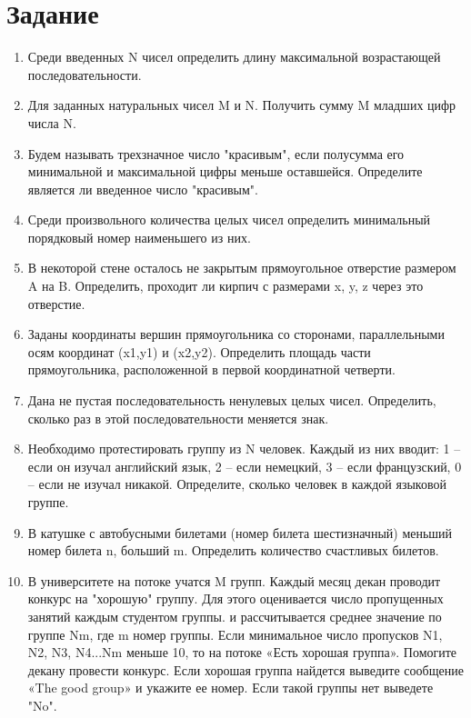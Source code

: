 \documentclass[a4paper,14pt]{extarticle}
\begin{document}
  \section*{Задание}
  \begin{enumerate}
    \item Среди введенных N чисел определить длину максимальной возрастающей последовательности.
    
    \item Для заданных натуральных чисел M и N. Получить сумму M младших цифр числа N.
    
    \item Будем называть трехзначное число "красивым", если полусумма его минимальной и максимальной цифры меньше оставшейся. Определите является ли введенное число "красивым".
    
    \item Среди произвольного количества целых чисел определить минимальный порядковый номер наименьшего из них.
    
    \item В некоторой стене осталось не закрытым прямоугольное отверстие размером A на B. Определить, проходит ли кирпич с размерами x, y, z через это отверстие.
    
    \item Заданы координаты вершин прямоугольника со сторонами, параллельными осям координат (x1,y1) и (x2,y2). Определить площадь части прямоугольника, расположенной в первой координатной четверти.
    
    \item Дана не пустая последовательность ненулевых целых чисел. Определить, сколько раз в этой последовательности меняется знак.
    
    \item Необходимо протестировать группу из N человек. Каждый из них вводит: 1 – если он изучал английский язык, 2 – если немецкий, 3 – если французский, 0 – если не изучал никакой. Определите, сколько человек в каждой языковой группе.
    
    \item В катушке с автобусными билетами (номер билета шестизначный) меньший номер билета n, больший m. Определить количество счастливых билетов.
    
    \item В университете на потоке учатся M групп. Каждый месяц декан проводит конкурс на "хорошую" группу. Для этого оценивается число пропущенных занятий каждым студентом группы. и рассчитывается среднее значение по группе Nm, где m номер группы. Если минимальное число пропусков N1, N2, N3, N4...Nm меньше 10, то на потоке «Есть хорошая группа». Помогите декану провести конкурс. Если хорошая группа найдется выведите сообщение «The good group» и укажите ее номер. Если такой группы нет выведете "No".
    

\end{enumerate}
\end{document}

